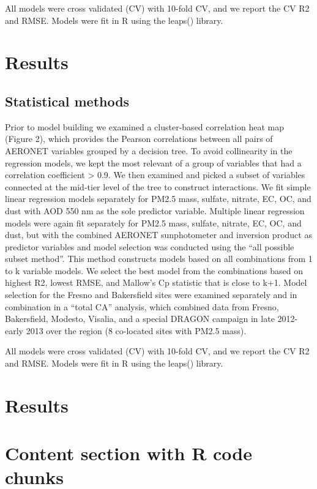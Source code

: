 \documentclass[, manuscript]{copernicus}
\begin{document}
All models were cross validated (CV) with 10-fold CV, and we report the
CV R2 and RMSE. Models were fit in R using the leaps() library.

\section{Results}

\subsection{Statistical methods}

Prior to model building we examined a cluster-based correlation heat map
(Figure 2), which provides the Pearson correlations between all pairs of
AERONET variables grouped by a decision tree. To avoid collinearity in
the regression models, we kept the most relevant of a group of variables
that had a correlation coefficient \textgreater{}
\textbar{}0.9\textbar{}. We then examined and picked a subset of
variables connected at the mid-tier level of the tree to construct
interactions. We fit simple linear regression models separately for
PM2.5 mass, sulfate, nitrate, EC, OC, and dust with AOD 550 nm as the
sole predictor variable. Multiple linear regression models were again
fit separately for PM2.5 mass, sulfate, nitrate, EC, OC, and dust, but
with the combined AERONET sunphotometer and inversion product as
predictor variables and model selection was conducted using the ``all
possible subset method''. This method constructs models based on all
combinations from 1 to k variable models. We select the best model from
the combinations based on highest R2, lowest RMSE, and Mallow's Cp
statistic that is close to k+1. Model selection for the Fresno and
Bakersfield sites were examined separately and in combination in a
``total CA'' analysis, which combined data from Fresno, Bakersfield,
Modesto, Visalia, and a special DRAGON campaign in late 2012-early 2013
over the region (8 co-located sites with PM2.5 mass).

All models were cross validated (CV) with 10-fold CV, and we report the
CV R2 and RMSE. Models were fit in R using the leaps() library.

\section{Results}

\section{Content section with R code chunks}
\end{document}

